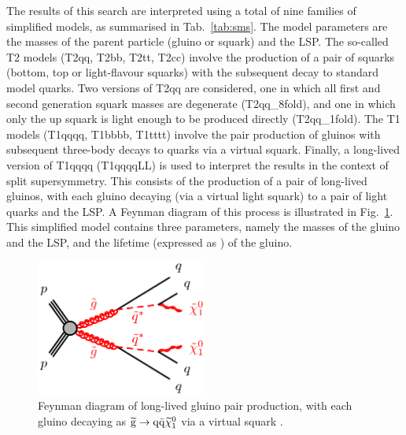 The results of this search are interpreted using a total of nine families of 
simplified models, as summarised in Tab.~\ref{tab:sms}. The model parameters 
are the masses of the parent particle (gluino or squark) and the LSP. The 
so-called T2 
models (T2qq, T2bb, T2tt, T2cc) involve the production of a pair of squarks 
(bottom, top or light-flavour squarks) with the subsequent decay to standard 
model quarks. Two versions of T2qq are considered, one in which all first and 
second generation squark 
masses are degenerate (T2qq\_8fold), and one in which only the up squark is 
light enough to be produced directly (T2qq\_1fold). 
The T1 models (T1qqqq, T1bbbb, T1tttt) involve the pair production of gluinos 
with subsequent three-body decays to quarks via a virtual squark. 
Finally, a long-lived version of T1qqqq (T1qqqqLL) is used to interpret the 
results in the context of split supersymmetry. This consists of the production 
of a pair of long-lived gluinos, with each gluino decaying (via a virtual light 
squark) to a pair of light quarks and the LSP. 
A Feynman diagram of this process is illustrated in Fig.~\ref{fig:T1qqqqLL}.
This simplified model contains three parameters, namely the masses of the 
gluino and the LSP, and the lifetime (expressed as \ctau) of the gluino.

\begin{figure}
\includegraphics[width=0.5\textwidth]{figs/theory/T1qqqqLL}
\caption{Feynman diagram of long-lived gluino pair production, with each gluino 
decaying as $\mathrm{\widetilde{g}} \rightarrow \mathrm{q}\bar{\mathrm{q}}\widetilde{\chi}_1^0$ via a 
virtual squark \vsquark.}
\label{fig:T1qqqqLL}
\end{figure}

